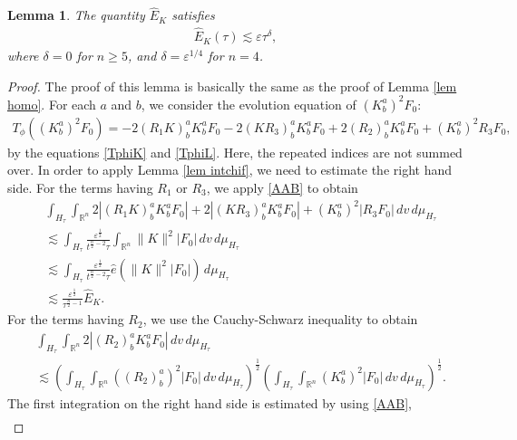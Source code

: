 \documentclass{article}
\newtheorem{lemma}{Lemma}[section]
\newcommand{\bbr}{{\mathbb R}}
\newcommand{\bbrn}{{\bbr^n}}
\begin{document}
%
\begin{lemma} \label{lem inhomo}
The quantity $ \hat{ E }_K $ satisfies
\begin{align*}
\hat{ E }_K ( \tau ) \lesssim \varepsilon \tau^\delta ,
\end{align*}
where $ \delta = 0 $ for $ n \geq 5 $, and $ \delta = \varepsilon^{ 1 / 4 } $ for $ n = 4 $.
\end{lemma}
%
\begin{proof}
The proof of this lemma is basically the same as the proof of Lemma \ref{lem homo}. For each $ a $ and $ b $, we consider the evolution equation of $ ( K^a_b )^2 F_0 $:
\begin{align*}
T_\phi ( ( K^a_b )^2 F_0 ) = - 2 ( R_1 K )^a_b K^a_b F_0 - 2 ( K R_3 )^a_b K^a_b F_0 + 2 ( R_2 )^a_b K^a_b F_0 + ( K^a_b )^2 R_3 F_0 ,
\end{align*}
by the equations \eqref{TphiK} and \eqref{TphiL}. Here, the repeated indices are not summed over. In order to apply Lemma \ref{lem intchif}, we need to estimate the right hand side. For the terms having $ R_1 $ or $ R_3 $, we apply \eqref{AAB} to obtain
\begin{align*}
& \int_{ H_\tau } \int_\bbrn 2 | ( R_1 K )^a_b K^a_b F_0 | + 2 | ( K R_3 )^a_b K^a_b F_0 | + ( K^a_b )^2 | R_3 F_0 | \, d v \, d \mu_{ H_\tau } \\
& \lesssim \int_{ H_\tau } \frac{ \varepsilon^\frac{ 1 }{ 2 } }{ t^{ \frac{ n }{ 2 } - 2 } \tau } \int_\bbrn \| K \|^2 | F_0 | \, d v \, d \mu_{ H_\tau } \\
& \lesssim \int_{ H_\tau } \frac{ \varepsilon^\frac{ 1 }{ 2 } }{ t^{ \frac{ n }{ 2 } - 2 } \tau } \hat{ e } ( \| K \|^2 | F_0 | ) \, d \mu_{ H_\tau } \\
& \lesssim \frac{ \varepsilon^\frac{ 1 }{ 2 } }{ \tau^{ \frac{ n }{ 2 } - 1 } } \hat{ E }_K .
\end{align*}
For the terms having $ R_2 $, we use the Cauchy-Schwarz inequality to obtain
\begin{align*}
& \int_{ H_\tau } \int_\bbrn 2 | ( R_2 )^a_b K^a_b F_0 | \, d v \, d \mu_{ H_\tau } \\
& \lesssim \left( \int_{ H_\tau } \int_\bbrn ( ( R_2 )^a_b )^2 | F_0 | \, d v \, d \mu_{ H_\tau } \right)^{ \frac{ 1 }{ 2 } } \left( \int_{ H_\tau } \int_\bbrn ( K^a_b )^2 | F_0 | \, d v \, d \mu_{ H_\tau } \right)^{ \frac{ 1 }{ 2 } } .
\end{align*}
The first integration on the right hand side is estimated by using \eqref{AAB},
\begin{align*}

\end{align*}
\end{proof}
\end{document}
